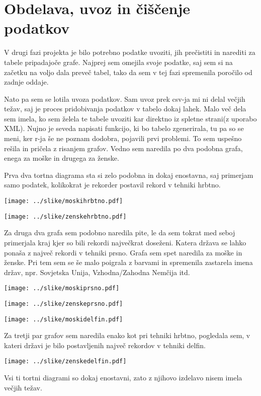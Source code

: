 \documentclass[11pt,a4paper]{article}
\begin{document}
\section{Obdelava, uvoz in čiščenje podatkov}

V drugi fazi projekta je bilo potrebno podatke uvoziti, jih prečistiti in narediti za tabele pripadajoče grafe. Najprej sem omejila svoje podatke, saj sem si na začetku na voljo dala preveč tabel, tako da sem v tej fazi spremenila poročilo od zadnje oddaje.

Nato pa sem se lotila uvoza podatkov. Sam uvoz prek csv-ja mi ni delal večjih težav, saj je proces pridobivanja podatkov v tabelo dokaj lahek. Malo več dela sem imela, ko sem želela te tabele uvoziti kar direktno iz spletne strani(z uporabo XML). Nujno je seveda napisati funkcijo, ki bo tabelo zgenerirala, tu pa so se meni, ker r-ja še ne poznam dodobra, pojavili prvi problemi. To sem uspešno rešila in pričela z risanjem grafov. Vedno sem naredila po dva podobna grafa, enega za moške in drugega za ženske.

Prva dva tortna diagrama sta si zelo podobna in dokaj enostavna, saj primerjam samo podatek, kolikokrat je rekorder postavil rekord v tehniki hrbtno. 


\texttt{[image: ../slike/moskihrbtno.pdf]}

\texttt{[image: ../slike/zenskehrbtno.pdf]}


Za druga dva grafa sem podobno naredila pite, le da sem tokrat med seboj primerjala kraj kjer so bili rekordi največkrat doseženi. Katera država se lahko ponaša z največ rekordi v tehniki prsno. Grafa sem spet naredila za moške in ženske. Pri tem sem se še malo poigrala z barvami in spremenila zastarela imena držav, npr. Sovjetska Unija, Vzhodna/Zahodna Nemčija itd.

\texttt{[image: ../slike/moskiprsno.pdf]}

\texttt{[image: ../slike/zenskeprsno.pdf]}


\texttt{[image: ../slike/moskidelfin.pdf]}

Za tretji par grafov sem naredila enako kot pri tehniki hrbtno, pogledala sem, v kateri državi je bilo postavljenih največ rekordov v tehniki delfin. 

\texttt{[image: ../slike/zenskedelfin.pdf]}

Vsi ti tortni diagrami so dokaj enostavni, zato z njihovo izdelavo nisem imela večjih težav.
\end{document}
